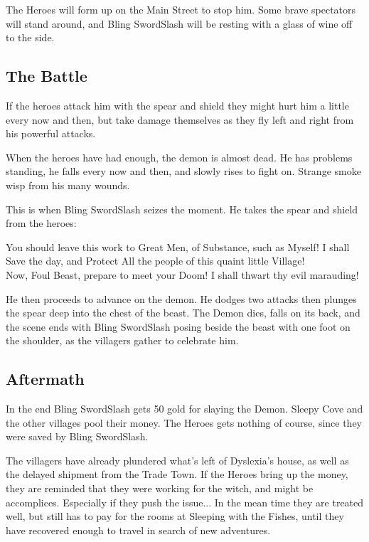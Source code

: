 The Heroes will form up on the Main Street to stop him. Some brave spectators will stand around, and Bling SwordSlash will be resting with a glass of wine off to the side.


\subsection*{The Battle}
If the heroes attack him with the spear and shield they might hurt him a little every now and then, but take damage themselves as they fly left and right from his powerful attacks.

When the heroes have had enough, the demon is almost dead. He has problems standing, he falls every now and then, and slowly rises to fight on. Strange smoke wisp from his many wounds.

This is when Bling SwordSlash seizes the moment. He takes the spear and shield from the heroes:

\begin{readoutloud}
You should leave this work to Great Men, of Substance, such as Myself! I shall Save the day, and Protect All the people of this quaint little Village! \\
Now, Foul Beast, prepare to meet your Doom! I shall thwart thy evil marauding!
\end{readoutloud}

He then proceeds to advance on the demon. He dodges two attacks then plunges the spear deep into the chest of the beast. The Demon dies, falls on its back, and the scene ends with Bling SwordSlash posing beside the beast with one foot on the shoulder, as the villagers gather to celebrate him.


\subsection*{Aftermath}
In the end Bling SwordSlash gets 50 gold for slaying the Demon. Sleepy Cove and the other villages pool their money. The Heroes gets nothing of course, since they were saved by Bling SwordSlash.

The villagers have already plundered what's left of Dyslexia's house, as well as the delayed shipment from the Trade Town. If the Heroes bring up the money, they are reminded that they were working for the witch, and might be accomplices. Especially if they push the issue... In the mean time they are treated well, but still has to pay for the rooms at Sleeping with the Fishes, until they have recovered enough to travel in search of new adventures.

